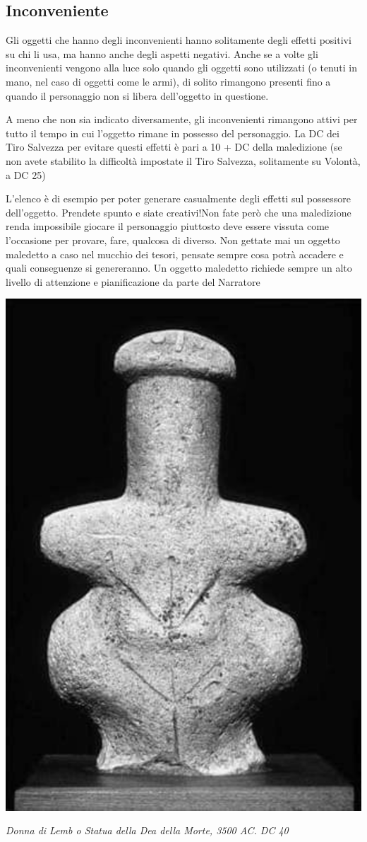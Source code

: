 \begin{multicols}{2}
\subsection{Inconveniente}

Gli oggetti che hanno degli inconvenienti hanno solitamente degli effetti positivi su chi li usa, ma hanno anche degli aspetti negativi. Anche se a volte gli inconvenienti vengono alla luce solo quando gli oggetti sono utilizzati (o tenuti in mano, nel caso di oggetti come le armi), di solito rimangono presenti fino a quando il personaggio non si libera dell'oggetto in questione.

A meno che non sia indicato diversamente, gli inconvenienti rimangono attivi per tutto il tempo in cui l'oggetto rimane in possesso del personaggio. La DC dei Tiro Salvezza per evitare questi effetti è pari a 10 + DC della maledizione (se non avete stabilito la difficoltà impostate il Tiro Salvezza, solitamente su Volontà, a DC 25)

\medskip

\begin{narratore}
L'elenco è di esempio per poter generare casualmente degli effetti sul possessore dell'oggetto. Prendete spunto e siate creativi!Non fate però che una maledizione renda impossibile giocare il personaggio piuttosto deve essere vissuta come l'occasione per provare, fare, qualcosa di diverso. Non gettate mai un oggetto maledetto a caso nel mucchio dei tesori, pensate sempre cosa potrà accadere e quali conseguenze si genereranno. Un oggetto maledetto richiede sempre un alto livello di attenzione e pianificazione da parte del Narratore\end{narratore}

\medskip

\end{multicols}

\vfill

\begin{center}
\includegraphics[width=0.35\linewidth]{immagini/donnalemb.png}

\emph{Donna di Lemb o Statua della Dea della Morte, 3500 AC. DC 40}
\end{center}

